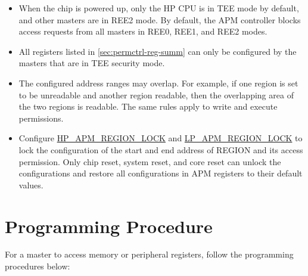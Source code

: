 \documentclass[main\_\_EN.tex]{subfiles}
\begin{document}
\begin{tiplisting}
\vspace{-2em}
\begin{itemize}
    \item When the chip is powered up, only the HP CPU is in TEE mode by default, and other masters are in REE2 mode. By default, the APM controller blocks access requests from all masters in REE0, REE1, and REE2 modes.
    \item All registers listed in \ref{sec:permctrl-reg-summ} \textit{} can only be configured by the masters that are in TEE security mode.
    \item The configured address ranges may overlap. For example, if one region is set to be unreadable and another region readable, then the overlapping area of the two regions is readable. The same rules apply to write and execute permissions.
    \item Configure \hyperref[fielddesc:HPAPMREGIONNLOCK]{HP\_APM\_REGION\_LOCK} and \hyperref[fielddesc:LPAPMREGIONNLOCK]{LP\_APM\_REGION\_LOCK} to lock the configuration of the start and end address of REGION and its access permission. Only chip reset, system reset, and core reset can unlock the configurations and restore all configurations in APM registers to their default values.
\end{itemize}
\end{tiplisting}

\section{Programming Procedure}

For a master to access memory or peripheral registers, follow the programming procedures below:
\end{document}

